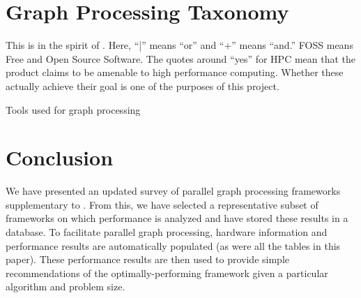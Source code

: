 \documentclass[11pt]{article}
\begin{document}
\section{Graph Processing Taxonomy}
This is in the spirit of \cite{Doekemeijer:2015:GPFSurvey}. Here, ``|'' means ``or'' and ``+'' means ``and.'' FOSS means Free and Open Source Software. The quotes around ``yes'' for HPC mean that the product claims to be amenable to high performance computing. Whether these actually achieve their goal is one of the purposes of this project.
\begin{table}[!htb]
	\begin{minipage}{\linewidth} %
		\centering
		\caption{Tools used for graph processing}
		\label{tab:frameworks}
	\end{minipage}
\end{table}


\section{Conclusion} %
We have presented an updated survey of parallel graph processing frameworks supplementary to \cite{Doekemeijer:2015:GPFSurvey}. From this, we have selected a representative subset of frameworks on which performance is analyzed and have stored these results in a database. To facilitate parallel graph processing, hardware information and performance results are automatically populated (as were all the tables in this paper). These performance results are then used to provide simple recommendations of the optimally-performing framework given a particular algorithm and problem size.



\end{document}
